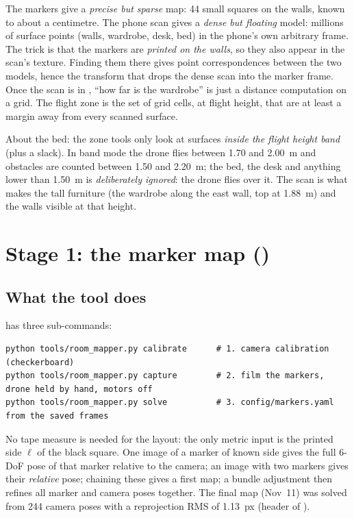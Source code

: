 \begin{intuition}
The markers give a \emph{precise but sparse} map: 44 small squares on the walls, known to about a centimetre.
The phone scan gives a \emph{dense but floating} model: millions of surface points (walls, wardrobe, desk, bed)
in the phone's own arbitrary frame. The trick is that the markers are \emph{printed on the walls}, so they also
appear in the scan's texture. Finding them there gives point correspondences between the two models, hence the
transform that drops the dense scan into the marker frame. Once the scan is in , ``how far is the
wardrobe'' is just a distance computation on a grid. The flight zone is the set of grid cells, at flight height,
that are at least a margin away from every scanned surface.
\end{intuition}

About the bed: the zone tools only look at surfaces \emph{inside the flight height band} (plus a slack). In band
mode the drone flies between 1.70 and 2.00~m and obstacles are counted between 1.50 and 2.20~m; the bed, the desk
and anything lower than 1.50~m is \emph{deliberately ignored}: the drone flies over it. The scan is what makes the
tall furniture (the wardrobe along the east wall, top at 1.88~m) and the walls visible at that height.

\section{Stage 1: the marker map (\texorpdfstring{}{room\_mapper.py})}
\label{sec:mapping-mapper}

\subsection{What the tool does}

 has three sub-commands:
\begin{lstlisting}
python tools/room_mapper.py calibrate      # 1. camera calibration (checkerboard)
python tools/room_mapper.py capture        # 2. film the markers, drone held by hand, motors off
python tools/room_mapper.py solve          # 3. config/markers.yaml from the saved frames
\end{lstlisting}
No tape measure is needed for the layout: the only metric input is the printed side $\ell$ of the black square.
One image of a marker of known side gives the full 6-DoF pose of that marker relative to the camera; an image
with two markers gives their \emph{relative} pose; chaining these gives a first map; a bundle adjustment then
refines all marker and camera poses together. The final map (Nov~11) was solved from 244 camera poses with a
reprojection RMS of 1.13~px (header of ).

